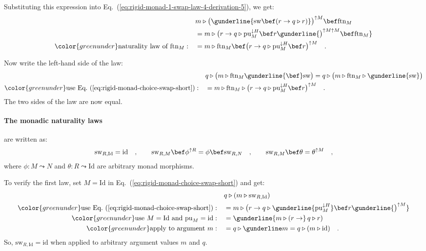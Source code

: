 Substituting this expression into Eq.~(\ref{eq:rigid-monad-1-swap-law-4-derivation-5}),
we get:
\begin{align*}
 & m\triangleright\big(\gunderline{\text{sw}\bef(r\rightarrow q\triangleright r)}\big)^{\uparrow M}\bef\text{ftn}_{M}\\
 & =m\triangleright\big(r\rightarrow q\triangleright\text{pu}_{M}^{\downarrow H}\bef r\gunderline{\big)^{\uparrow M\uparrow M}\bef\text{ftn}_{M}}\\
{\color{greenunder}\text{naturality law of }\text{ftn}_{M}:}\quad & =m\triangleright\text{ftn}_{M}\bef\big(r\rightarrow q\triangleright\text{pu}_{M}^{\downarrow H}\bef r\big)^{\uparrow M}\quad.
\end{align*}

Now write the left-hand side of the law:
\begin{align*}
 & q\triangleright\big(m\triangleright\text{ftn}_{M}\gunderline{\bef}\text{sw}\big)=q\triangleright\big(m\triangleright\text{ftn}_{M}\triangleright\gunderline{\text{sw}}\big)\\
{\color{greenunder}\text{use Eq.~(\ref{eq:rigid-monad-choice-swap-short})}:}\quad & =m\triangleright\text{ftn}_{M}\triangleright\big(r\rightarrow q\triangleright\text{pu}_{M}^{\downarrow H}\bef r\big)^{\uparrow M}\quad.
\end{align*}
The two sides of the law are now equal.

\paragraph{The monadic naturality laws}

are written as:
\[
\text{sw}_{R,\text{Id}}=\text{id}\quad,\quad\quad\text{sw}_{R,M}\bef\phi^{\uparrow R}=\phi\bef\text{sw}_{R,N}\quad,\quad\quad\text{sw}_{R,M}\bef\theta=\theta^{\uparrow M}\quad,
\]
where $\phi:M\leadsto N$ and $\theta:R\leadsto\text{Id}$ are arbitrary
monad morphisms. 

To verify the first law, set $M=\text{Id}$ in Eq.~(\ref{eq:rigid-monad-choice-swap-short})
and get:
\begin{align*}
 & q\triangleright(m\triangleright\text{sw}_{R,\text{Id}})\\
{\color{greenunder}\text{use Eq.~(\ref{eq:rigid-monad-choice-swap-short})}:}\quad & =m\triangleright\big(r\rightarrow q\triangleright\gunderline{\text{pu}_{M}^{\downarrow H}}\bef r\gunderline{\big)^{\uparrow M}}\\
{\color{greenunder}\text{use }M=\text{Id}\text{ and }\text{pu}_{M}=\text{id}:}\quad & =\gunderline{m\triangleright(r\rightarrow}\,q\triangleright r)\\
{\color{greenunder}\text{apply to argument }m:}\quad & =q\triangleright\gunderline m=q\triangleright(m\triangleright\text{id})\quad.
\end{align*}
So, $\text{sw}_{R,\text{Id}}=\text{id}$ when applied to arbitrary
argument values $m$ and $q$.

